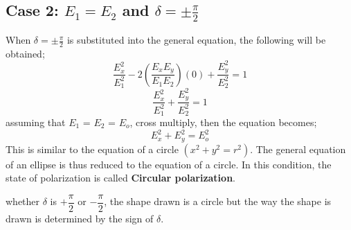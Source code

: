 \subsection{Case 2: $ E_1 = E_2 $ and $\delta = \pm \frac{\pi}{2}$}
When $\delta = \pm \frac{\pi}{2}$ is substituted into the general equation, the following will be obtained;
\begin{equation}
\frac{E_{x}^2}{E_{1}^2} -2(\frac{E_{x}E_{y}}{E_{1}E_{2}})(0) + \frac{E_{y}^2}{E_{2}^2} = 1
\end{equation}
\begin{equation}
\frac{E_{x}^2}{E_{1}^2} + \frac{E_{y}^2}{E_{2}^2} = 1
\end{equation}
assuming that $ E_1 $ = $ E_2 $ = $ E_{o} $, cross multiply, then the equation becomes;
\begin{equation}
{E_{x}^2} + {E_{y}^2} = {E_{o}^2}
\end{equation}
This is similar to the equation of a circle $(x^2 + y^2 = r^2)$. The general equation of an ellipse is thus reduced to the equation of a circle. In this condition, the state of polarization is called \textbf{Circular polarization}.

whether  $\delta$ is $+\dfrac{\pi}{2}$  or  $-\dfrac{\pi}{2} $, the shape drawn is a circle but the way the shape is drawn is determined by the sign of $\delta$.

